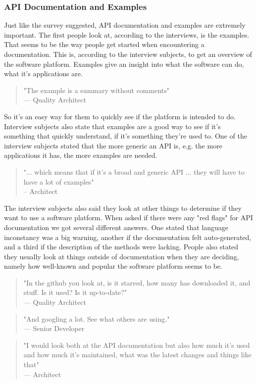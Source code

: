 \documentclass{article}
\begin{document}
\subsubsection{API Documentation and Examples}
Just like the survey suggested, API documentation and examples are extremely important. The first people look at, according to the interviews, is the examples. That seems to be the way people get started when encountering a documentation. This is, according to the interview subjects, to get an overview of the software platform. Examples give an insight into what the software can do, what it's applications are.
\begin{quote}
"The example is a summary without comments" \\
--- Quality Architect
\end{quote}
So it's an easy way for them to quickly see if the platform is intended to do. Interview subjects also state that examples are a good way to see if it's something that quickly understand, if it's something they're used to. One of the interview subjects stated that the more generic an API is, e.g. the more applications it has, the more examples are needed.
\begin{quote}
"... which means that if it's a broad and generic API ... they will have to have a lot of examples" \\
-- Architect
\end{quote}
The interview subjects also said they look at other things to determine if they want to use a software platform. When asked if there were any "red flags" for API documentation we got several different answers. One stated that language inconstancy was a big warning, another if the documentation felt auto-generated, and a third if the description of the methods were lacking. People also stated they usually look at things outside of documentation when they are deciding, namely how well-known and popular the software platform seems to be.
\begin{quote}
"In the github you look at, is it starred, how many has downloaded it, and stuff. Is it used? Is it up-to-date?" \\
--- Quality Architect
\end{quote}
\begin{quote}
"And googling a lot. See what others are using."\\
--- Senior Developer \\
\end{quote}
\begin{quote}
"I would look both at the API documentation but also how much it's used and how much it's maintained, what was the latest changes and things like that" \\
--- Architect
\end{quote}
\end{document}
